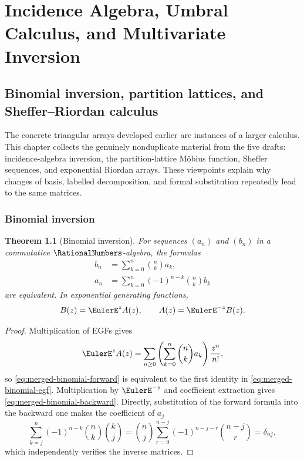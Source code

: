 \documentclass[11pt,a4paper,oneside,openany]{book}
\newtheorem{theorem}{Theorem}[chapter]
\theoremstyle{definition}
\theoremstyle{remark}
\begin{document}
\part{Incidence Algebra, Umbral Calculus, and Multivariate Inversion}

\chapter{Binomial inversion, partition lattices, and Sheffer--Riordan calculus}
\label{ch:merged-umbral}

The concrete triangular arrays developed earlier are instances of a larger
calculus.  This chapter collects the genuinely nonduplicate material from the
five drafts: incidence-algebra inversion, the partition-lattice Möbius
function, Sheffer sequences, and exponential Riordan arrays.  These viewpoints
explain why changes of basis, labelled decomposition, and formal substitution
repeatedly lead to the same matrices.

\section{Binomial inversion}

\begin{theorem}[Binomial inversion]
\label{thm:merged-binomial-inversion}
For sequences $(a_n)$ and $(b_n)$ in a commutative $\RationalNumbers$-algebra, the formulas
\begin{align}
 b_n&=\sum_{k=0}^{n}\binom nk a_k,                                  \label{eq:merged-binomial-forward}\\
 a_n&=\sum_{k=0}^{n}(-1)^{n-k}\binom nk b_k                         \label{eq:merged-binomial-backward}
\end{align}
are equivalent.  In exponential generating functions,
\begin{equation}
 B(z)=\EulerE^zA(z),\qquad A(z)=\EulerE^{-z}B(z).                               \label{eq:merged-binomial-egf}
\end{equation}
\end{theorem}

\begin{proof}
Multiplication of EGFs gives
\[
 \EulerE^zA(z)=\sum_{n\geq0}\left(\sum_{k=0}^{n}\binom nk a_k\right)
             \frac{z^n}{n!},
\]
so \eqref{eq:merged-binomial-forward} is equivalent to the first identity in
\eqref{eq:merged-binomial-egf}.  Multiplication by $\EulerE^{-z}$ and coefficient
extraction gives \eqref{eq:merged-binomial-backward}.  Directly, substitution
of the forward formula into the backward one makes the coefficient of $a_j$
\[
 \sum_{k=j}^{n}(-1)^{n-k}\binom nk\binom kj
 =\binom nj\sum_{r=0}^{n-j}(-1)^{n-j-r}\binom{n-j}{r}
 =\delta_{nj},
\]
which independently verifies the inverse matrices.
\end{proof}
\end{document}
